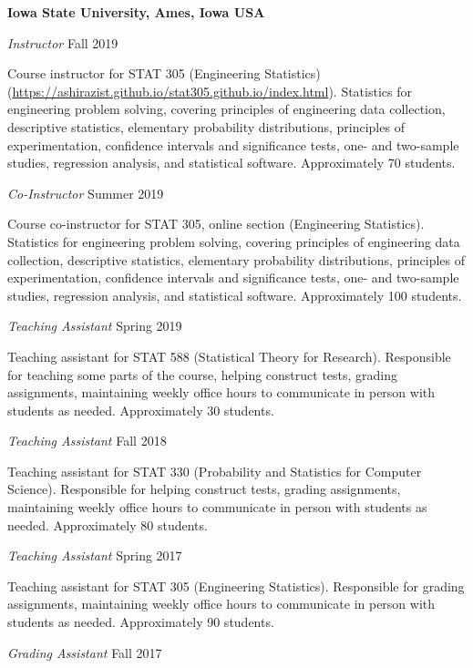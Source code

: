 \documentclass[margin,line]{res}
\begin{document}
\begin{resume}
{\bf Iowa State University, Ames, Iowa USA}

{\em Instructor} \hfill { Fall 2019}

\vspace{-.3cm}
Course instructor for STAT 305 (Engineering Statistics) (\url{https://ashirazist.github.io/stat305.github.io/index.html}). Statistics for engineering problem solving, covering principles of engineering data collection, descriptive statistics, elementary probability distributions, principles of experimentation, confidence intervals and significance tests, one- and two-sample studies, regression analysis, and statistical software. Approximately 70 students.

{\em Co-Instructor} \hfill { Summer 2019}

\vspace{-.3cm}
Course co-instructor for STAT 305, online section (Engineering Statistics). Statistics for engineering problem solving, covering principles of engineering data collection, descriptive statistics, elementary probability distributions, principles of experimentation, confidence intervals and significance tests, one- and two-sample studies, regression analysis, and statistical software. Approximately 100 students.

{\em Teaching Assistant} \hfill { Spring 2019}

\vspace{-.3cm}
Teaching assistant for STAT 588 (Statistical Theory for Research). Responsible for teaching some parts of the course, helping construct tests, grading assignments, maintaining weekly office hours to communicate in person with students as needed. Approximately 30 students.

{\em Teaching Assistant} \hfill { Fall 2018}

\vspace{-.3cm}
Teaching assistant for STAT 330 (Probability and Statistics for Computer Science). Responsible for  helping construct tests, grading assignments, maintaining weekly office hours to communicate in person with students as needed. Approximately 80 students.

{\em Teaching Assistant} \hfill { Spring 2017}

\vspace{-.3cm}
Teaching assistant for STAT 305  (Engineering Statistics). Responsible for grading assignments, maintaining weekly office hours to communicate in person with students as needed. Approximately 90 students.

{\em Grading Assistant} \hfill { Fall 2017}


\end{resume}
\end{document}
